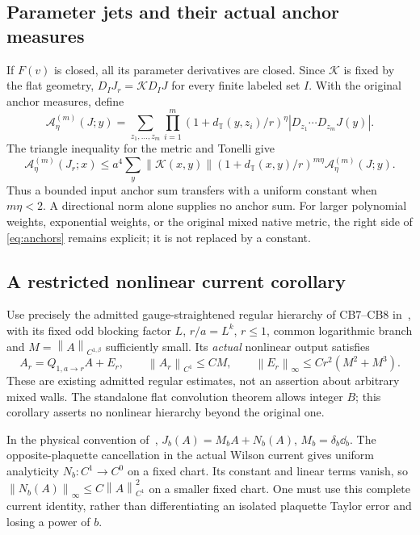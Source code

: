 \documentclass[11pt,letterpaper]{article}
\numberwithin{equation}{section}
\theoremstyle{definition}\newtheorem{definition}[theorem]{Definition}
\theoremstyle{remark}\newtheorem{remark}[theorem]{Remark}
\newcommand{\norm}[1]{\left\lVert #1\right\rVert}
\newcommand{\Kern}{\mathcal K}
\begin{document}
\subsection{Parameter jets and their actual anchor measures}

If $F(v)$ is closed, all its parameter derivatives are closed. Since $\Kern$ is fixed by the flat geometry, $D_IJ_r=\Kern D_IJ$ for every finite labeled set $I$. With the original anchor measures, define
\[
 \mathcal A^{(m)}_\eta(J;y)=\sum_{z_1,\ldots,z_m}
 \prod_{i=1}^m(1+d_{\mathbb T}(y,z_i)/r)^\eta
 |D_{z_1}\cdots D_{z_m}J(y)|.
\]
The triangle inequality for the metric and Tonelli give
\begin{equation}
 \mathcal A^{(m)}_\eta(J_r;x)
 \le a^4\sum_y\norm{\Kern(x,y)}
 (1+d_{\mathbb T}(x,y)/r)^{m\eta}\mathcal A^{(m)}_\eta(J;y).
 \label{eq:anchors}
\end{equation}
Thus a bounded input anchor sum transfers with a uniform constant when $m\eta<2$. A directional norm alone supplies no anchor sum. For larger polynomial weights, exponential weights, or the original mixed native metric, the right side of \eqref{eq:anchors} remains explicit; it is not replaced by a constant.

\subsection{A restricted nonlinear current corollary}

Use precisely the admitted gauge-straightened regular hierarchy of CB7--CB8 in~\cite[pp.~666--669]{W}, with its fixed odd blocking factor $L$, $r/a=L^k$, $r\le1$, common logarithmic branch and $M=\norm A_{C^{1,\beta}}$ sufficiently small. Its \emph{actual} nonlinear output satisfies
\begin{equation}
 A_r=Q_{1,a\to r}A+E_r,\qquad
 \norm{A_r}_{C^1}\le CM,\qquad
 \norm{E_r}_\infty\le Cr^2(M^2+M^3).
 \label{eq:CBinput}
\end{equation}
These are existing admitted regular estimates, not an assertion about arbitrary mixed walls. The standalone flat convolution theorem allows integer $B$; this corollary asserts no nonlinear hierarchy beyond the original one.

In the physical convention of~\cite[\S2]{UA},
$J_b(A)=M_bA+N_b(A)$, $M_b=\delta_b\dd_b$. The opposite-plaquette cancellation in the actual Wilson current gives uniform analyticity $N_b:C^1\to C^0$ on a fixed chart. Its constant and linear terms vanish, so $\norm{N_b(A)}_\infty\le C\norm A_{C^1}^2$ on a smaller fixed chart. One must use this complete current identity, rather than differentiating an isolated plaquette Taylor error and losing a power of $b$.
\end{document}
